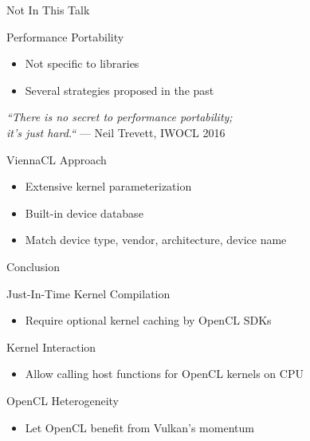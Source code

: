 \begin{frame}{Not In This Talk}

 \begin{block}{Performance Portability}
   \begin{itemize}
    \item Not specific to libraries
    \item Several strategies proposed in the past
   \end{itemize}
 \end{block}
 \vspace*{.5cm}
 
 \begin{center}
  \textit{``There is no secret to performance portability;\\
          it's just hard.``} --- Neil Trevett, IWOCL 2016
 \end{center}

 
 \vspace*{.5cm}
  \begin{block}{ViennaCL Approach}
   \begin{itemize}
    \item Extensive kernel parameterization
    \item Built-in device database
    \item Match device type, vendor, architecture, device name
   \end{itemize}
 \end{block}
\end{frame}

















\begin{frame}{Conclusion}

 \begin{block}{Just-In-Time Kernel Compilation}
   \begin{itemize}
    \item Require optional kernel caching by OpenCL SDKs
   \end{itemize}
 \end{block}

 \begin{block}{Kernel Interaction}
   \begin{itemize}
    \item Allow calling host functions for OpenCL kernels on CPU
   \end{itemize}
 \end{block}

  \begin{block}{OpenCL Heterogeneity}
   \begin{itemize}
    \item Let OpenCL benefit from Vulkan's momentum
   \end{itemize}
 \end{block}
\end{frame}
